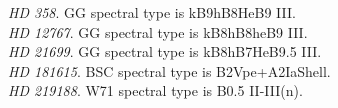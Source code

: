 \emph{HD 358}. GG spectral type is  kB9hB8HeB9 III. \\
\emph{HD 12767}. GG spectral type is  kB8hB8heB9 III. \\
\emph{HD 21699}. GG spectral type is  kB8hB7HeB9.5 III. \\
\emph{HD 181615}. BSC spectral type is B2Vpe+A2IaShell.\\
\emph{HD 219188}. W71 spectral type is  B0.5 II-III(n). \\
